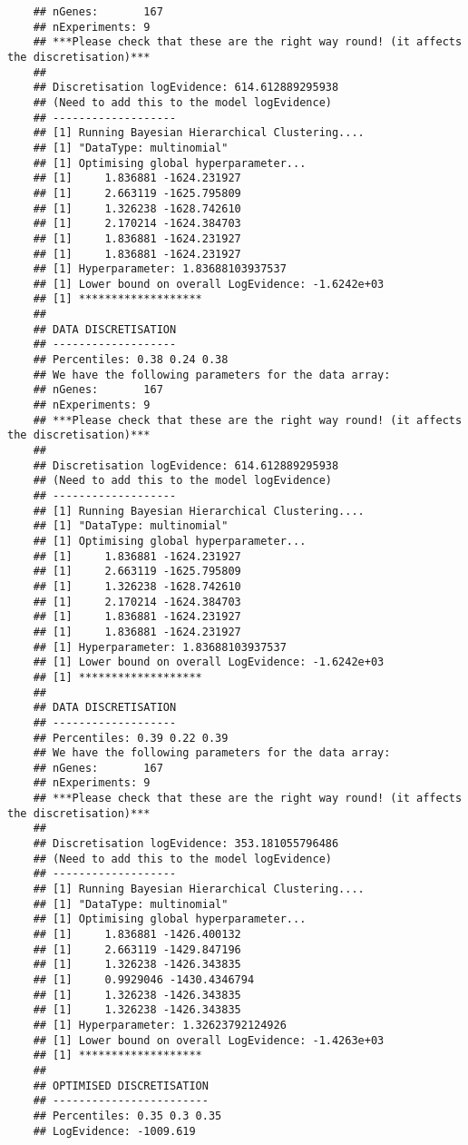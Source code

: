 \begin{verbatim}
    ## nGenes:       167
    ## nExperiments: 9
    ## ***Please check that these are the right way round! (it affects the discretisation)***
    ## 
    ## Discretisation logEvidence: 614.612889295938
    ## (Need to add this to the model logEvidence)
    ## -------------------
    ## [1] Running Bayesian Hierarchical Clustering....
    ## [1] "DataType: multinomial"
    ## [1] Optimising global hyperparameter...
    ## [1]     1.836881 -1624.231927
    ## [1]     2.663119 -1625.795809
    ## [1]     1.326238 -1628.742610
    ## [1]     2.170214 -1624.384703
    ## [1]     1.836881 -1624.231927
    ## [1]     1.836881 -1624.231927
    ## [1] Hyperparameter: 1.83688103937537
    ## [1] Lower bound on overall LogEvidence: -1.6242e+03
    ## [1] *******************
    ## 
    ## DATA DISCRETISATION
    ## -------------------
    ## Percentiles: 0.38 0.24 0.38 
    ## We have the following parameters for the data array:
    ## nGenes:       167
    ## nExperiments: 9
    ## ***Please check that these are the right way round! (it affects the discretisation)***
    ## 
    ## Discretisation logEvidence: 614.612889295938
    ## (Need to add this to the model logEvidence)
    ## -------------------
    ## [1] Running Bayesian Hierarchical Clustering....
    ## [1] "DataType: multinomial"
    ## [1] Optimising global hyperparameter...
    ## [1]     1.836881 -1624.231927
    ## [1]     2.663119 -1625.795809
    ## [1]     1.326238 -1628.742610
    ## [1]     2.170214 -1624.384703
    ## [1]     1.836881 -1624.231927
    ## [1]     1.836881 -1624.231927
    ## [1] Hyperparameter: 1.83688103937537
    ## [1] Lower bound on overall LogEvidence: -1.6242e+03
    ## [1] *******************
    ## 
    ## DATA DISCRETISATION
    ## -------------------
    ## Percentiles: 0.39 0.22 0.39 
    ## We have the following parameters for the data array:
    ## nGenes:       167
    ## nExperiments: 9
    ## ***Please check that these are the right way round! (it affects the discretisation)***
    ## 
    ## Discretisation logEvidence: 353.181055796486
    ## (Need to add this to the model logEvidence)
    ## -------------------
    ## [1] Running Bayesian Hierarchical Clustering....
    ## [1] "DataType: multinomial"
    ## [1] Optimising global hyperparameter...
    ## [1]     1.836881 -1426.400132
    ## [1]     2.663119 -1429.847196
    ## [1]     1.326238 -1426.343835
    ## [1]     0.9929046 -1430.4346794
    ## [1]     1.326238 -1426.343835
    ## [1]     1.326238 -1426.343835
    ## [1] Hyperparameter: 1.32623792124926
    ## [1] Lower bound on overall LogEvidence: -1.4263e+03
    ## [1] *******************
    ## 
    ## OPTIMISED DISCRETISATION
    ## ------------------------
    ## Percentiles: 0.35 0.3 0.35
    ## LogEvidence: -1009.619
    \end{verbatim}
    
